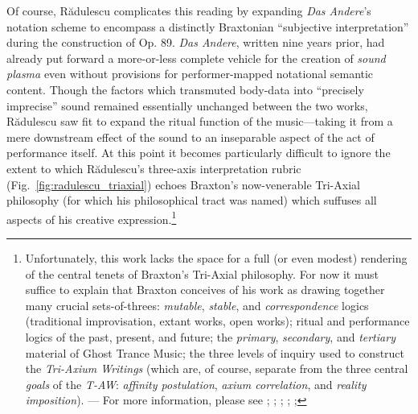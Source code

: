     Of course, R\u{a}dulescu complicates this reading by expanding \textit{Das Andere}'s notation scheme to encompass a distinctly Braxtonian ``subjective interpretation'' during the construction of Op. 89. \textit{Das Andere}, written nine years prior, had already put forward a more-or-less complete vehicle for the creation of \textit{sound plasma} even without provisions for performer-mapped notational semantic content. Though the factors which transmuted body-data into ``precisely imprecise'' sound remained essentially unchanged between the two works, R\u{a}dulescu saw fit to expand the ritual function of the music---taking it from a mere downstream effect of the sound to an inseparable aspect of the act of performance itself. At this point it becomes particularly difficult to ignore the extent to which R\u{a}dulescu's three-axis interpretation rubric (Fig.~\ref{fig:radulescu_triaxial}) echoes Braxton's now-venerable Tri-Axial philosophy (for which his philosophical tract was named) which suffuses all aspects of his creative expression.\footnote{Unfortunately, this work lacks the space for a full (or even modest) rendering of the central tenets of Braxton's Tri-Axial philosophy. For now it must suffice to explain that Braxton conceives of his work as drawing together many crucial sets-of-threes: \textit{mutable}, \textit{stable}, and \textit{correspondence} logics (traditional improvisation, extant works, open works); ritual and performance logics of the past, present, and future; the \textit{primary}, \textit{secondary}, and \textit{tertiary} material of Ghost Trance Music; the three levels of inquiry used to construct the \textit{Tri-Axium Writings} (which are, of course, separate from the three central \textit{goals} of the \textit{T-AW}: \textit{affinity postulation}, \textit{axium correlation}, and \textit{reality imposition}). --- For more information, please see ; ; ; ; ; }
    
